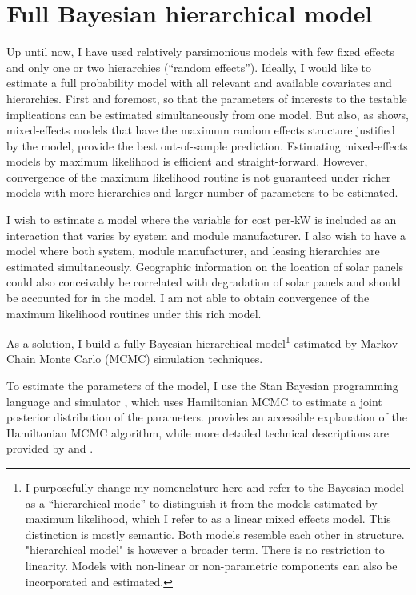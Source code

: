 \documentclass[a4paper]{article}
\begin{document}
\section{Full Bayesian hierarchical model}
Up until now, I have used relatively parsimonious models with few fixed effects and only one or two hierarchies (``random effects'').  Ideally, I would like to estimate a full probability model with all relevant and available covariates and hierarchies. First and foremost, so that the parameters of interests to the testable implications can be estimated simultaneously from one model. But also, as \citet{barr_random_2013} shows, mixed-effects models that have the maximum random effects structure justified by the model, provide the best out-of-sample prediction. Estimating mixed-effects models by maximum likelihood is efficient and straight-forward. However, convergence of the maximum likelihood routine is not guaranteed under richer models with more hierarchies and larger number of parameters to be estimated.

I wish to estimate a model where the variable for cost per-kW is included as an interaction that varies by system and module manufacturer. I also wish to have a model where both system, module manufacturer, and leasing hierarchies are estimated simultaneously. Geographic information on the location of solar panels could also conceivably be correlated with degradation of solar panels and should be accounted for in the model.  I am not able to obtain convergence of the maximum likelihood routines under this rich model.

As a solution, I build a fully Bayesian hierarchical model\footnote{I purposefully change my nomenclature here and refer to the Bayesian model as a ``hierarchical mode'' to distinguish it from the models estimated by maximum likelihood, which I refer to as a linear mixed effects model. This distinction is mostly semantic. Both models resemble each other in structure. "hierarchical model" is however a broader term. There is no restriction to linearity. Models with non-linear or non-parametric components can also be incorporated and estimated.} estimated by Markov Chain Monte Carlo (MCMC) simulation techniques.

To estimate the parameters of the model, I use the Stan Bayesian programming language and simulator \citep{stan_development_team_stan_2014}, which uses Hamiltonian MCMC to estimate a joint posterior distribution of the parameters. \citet{kruschke_doing_2014} provides an accessible explanation of the Hamiltonian MCMC algorithm, while more detailed technical descriptions are provided by \citet{gelman_bayesian_2013} and \citet{stan_development_team_stan_2014}.
\end{document}
